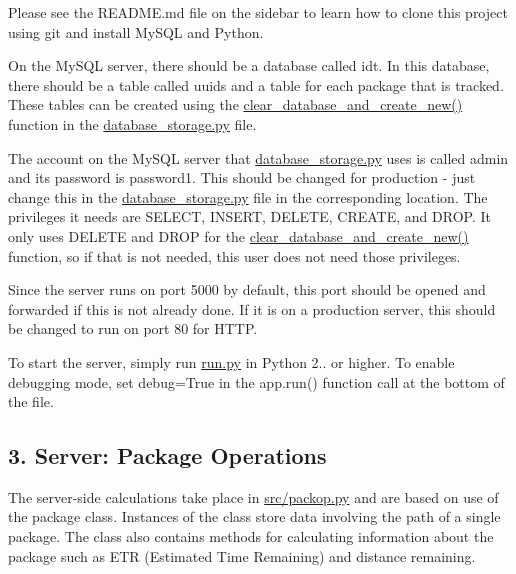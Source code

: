 Please see the R\+E\+A\+D\+M\+E.\+md file on the sidebar to learn how to clone this project using {\ttfamily git} and install My\+S\+QL and Python.

On the My\+S\+QL server, there should be a database called {\ttfamily idt}. In this database, there should be a table called {\ttfamily uuids} and a table for each package that is tracked. These tables can be created using the {\ttfamily \hyperlink{namespacesrc_1_1database__storage_ac8bfcdfbcc3f0aeb1244c86f125e89dc}{clear\+\_\+database\+\_\+and\+\_\+create\+\_\+new()}} function in the {\ttfamily \hyperlink{database__storage_8py}{database\+\_\+storage.\+py}} file.

The account on the My\+S\+QL server that \hyperlink{database__storage_8py}{database\+\_\+storage.\+py} uses is called {\ttfamily admin} and its password is {\ttfamily password1}. This should be changed for production -\/ just change this in the {\ttfamily \hyperlink{database__storage_8py}{database\+\_\+storage.\+py}} file in the corresponding location. The privileges it needs are {\ttfamily S\+E\+L\+E\+CT}, {\ttfamily I\+N\+S\+E\+RT}, {\ttfamily D\+E\+L\+E\+TE}, {\ttfamily C\+R\+E\+A\+TE}, and {\ttfamily D\+R\+OP}. It only uses {\ttfamily D\+E\+L\+E\+TE} and {\ttfamily D\+R\+OP} for the {\ttfamily \hyperlink{namespacesrc_1_1database__storage_ac8bfcdfbcc3f0aeb1244c86f125e89dc}{clear\+\_\+database\+\_\+and\+\_\+create\+\_\+new()}} function, so if that is not needed, this user does not need those privileges.

Since the server runs on port 5000 by default, this port should be opened and forwarded if this is not already done. If it is on a production server, this should be changed to run on port 80 for H\+T\+TP.

To start the server, simply run {\ttfamily \hyperlink{run_8py}{run.\+py}} in Python 2.. or higher. To enable debugging mode, set {\ttfamily debug=True} in the {\ttfamily app.\+run()} function call at the bottom of the file.

\subsection*{3. Server\+: Package Operations}

The server-\/side calculations take place in {\ttfamily \hyperlink{packop_8py}{src/packop.\+py}} and are based on use of the package class. Instances of the class store data involving the path of a single package. The class also contains methods for calculating information about the package such as E\+TR (Estimated Time Remaining) and distance remaining.

